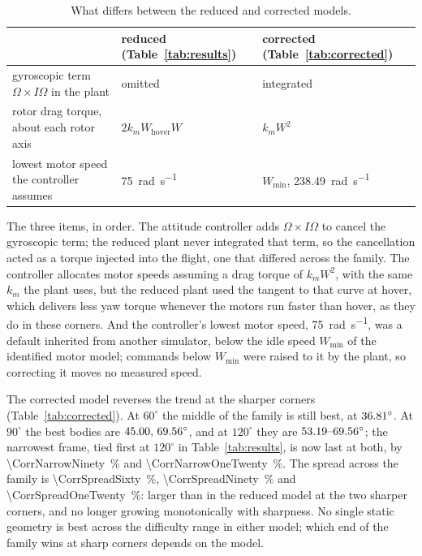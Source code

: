 \documentclass[11pt,a4paper]{article}
\begin{document}
\begin{table}[htb]
  \centering
  \caption{What differs between the reduced and corrected models.}
  \label{tab:models}
  \small
  \begin{tabular}{@{}l l l@{}}
    \toprule
    & reduced (Table~\ref{tab:results}) & corrected (Table~\ref{tab:corrected}) \\
    \midrule
    gyroscopic term $\Omega\times I\Omega$ in the plant & omitted & integrated \\
    rotor drag torque, about each rotor axis & $2k_m W_{\text{hover}} W$ & $k_m W^2$ \\
    lowest motor speed the controller assumes & \SI{75}{\radian\per\second} &
      $W_{\min}$, \SI{238.49}{\radian\per\second} \\
    \bottomrule
  \end{tabular}
\end{table}

The three items, in order. The attitude controller adds $\Omega\times I\Omega$
to cancel the gyroscopic term; the reduced plant never integrated that term, so
the cancellation acted as a torque injected into the flight, one that differed
across the family. The controller allocates motor speeds assuming a drag torque of
$k_m W^2$, with the same $k_m$ the plant uses, but the reduced plant used the
tangent to that curve at hover, which delivers less yaw torque whenever the
motors run faster than hover, as they do in these corners. And the controller's
lowest motor speed, \SI{75}{\radian\per\second}, was a default inherited from
another simulator, below the idle speed $W_{\min}$ of the identified motor model;
commands below $W_{\min}$ were raised to it by the plant, so correcting it moves
no measured speed.

\begin{table}[htb]
  \centering
  \caption{Maximum completing speed (\si{\metre\per\second}) by arm half-angle
  and corner sharpness, corrected model. Bold marks the best in each column, as
  in Table~\ref{tab:results}.}
  \label{tab:corrected}
  
\end{table}

The corrected model reverses the trend at the sharper corners
(Table~\ref{tab:corrected}). At $60^\circ$ the middle of the family is still best,
at $36.81^\circ$. At $90^\circ$ the best bodies are
$45.00\text{, }69.56^\circ$, and at $120^\circ$ they are
$53.19\text{--}69.56^\circ$; the narrowest frame, tied first at $120^\circ$ in
Table~\ref{tab:results}, is now last at both, by
\SI{\CorrNarrowNinety}{\percent} and \SI{\CorrNarrowOneTwenty}{\percent}. The
spread across the family is \SI{\CorrSpreadSixty}{\percent},
\SI{\CorrSpreadNinety}{\percent} and \SI{\CorrSpreadOneTwenty}{\percent}: larger
than in the reduced model at the two sharper corners, and no longer growing
monotonically with sharpness. No single static geometry is best across the
difficulty range in either model; which end of the family wins at sharp corners
depends on the model.
\end{document}
